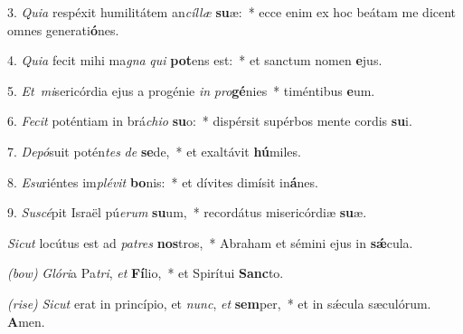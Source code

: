 3. \textit{Quia} respéxit humilitátem an\textit{cíl}\textit{læ} \textbf{su}æ:~*
	ecce enim ex hoc beátam me dicent omnes generati\textbf{ó}nes.

4. \textit{Quia} fecit mihi ma\textit{gna} \textit{qui} \textbf{pot}ens est:~*
	et sanctum nomen \textbf{e}jus.

5. \textit{Et\ mi}sericórdia ejus a progénie \textit{in} \textit{pro}\textbf{gé}nies~*
	timéntibus \textbf{e}um.

6. \textit{Fecit} poténtiam in brá\textit{chi}\textit{o} \textbf{su}o:~*
	dispérsit supérbos mente cordis \textbf{su}i.

7. \textit{Depó}suit potén\textit{tes} \textit{de} \textbf{se}de,~*
	et exaltávit \textbf{hú}miles.

8. \textit{Esu}riéntes im\textit{plé}\textit{vit} \textbf{bo}nis:~*
	et dívites dimísit in\textbf{á}nes.

9. \textit{Suscé}pit Israël pú\textit{e}\textit{rum} \textbf{su}um,~*
	recordátus misericórdiæ \textbf{su}æ.

\textit{Sicut} locútus est ad \textit{pa}\textit{tres} \textbf{nos}tros,~*
	Abraham et sémini ejus in \textbf{s\'{\ae}}cula.

\textit{(bow)} \textit{Glóri}a Pa\textit{tri}, \textit{et} \textbf{Fí}lio,~*
	et Spirítui \textbf{Sanc}to.

\textit{(rise)} \textit{Sicut} erat in princípio, et \textit{nunc}, \textit{et} \textbf{sem}per,~*
	et in s\'{\ae}cula sæculórum. \textbf{A}men.